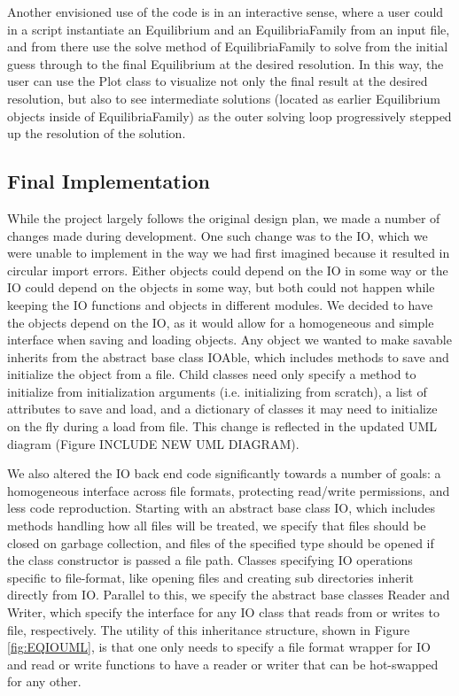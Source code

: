 \documentclass{article}
\begin{document}
Another envisioned use of the code is in an interactive sense, where a user could in a script instantiate an Equilibrium and an EquilibriaFamily from an input file, and from there use the solve method of EquilibriaFamily to solve from the initial guess through to the final Equilibrium at the desired resolution. In this way, the user can use the Plot class to visualize not only the final result at the desired resolution, but also to see intermediate solutions (located as earlier Equilibrium objects inside of EquilibriaFamily) as the outer solving loop progressively stepped up the resolution of the solution.

\subsection{Final Implementation}

While the project largely follows the original design plan, we made a number of changes made during development.
One such change was to the IO, which we were unable to implement in the way we had first imagined because it resulted in circular import errors.
Either objects could depend on the IO in some way or the IO could depend on the objects in some way, but both could not happen while keeping the IO functions and objects in different modules.
We decided to have the objects depend on the IO, as it would allow for a homogeneous and simple interface when saving and loading objects.
Any object we wanted to make savable inherits from the abstract base class IOAble, which includes methods to save and initialize the object from a file.
Child classes need only specify a method to initialize from initialization arguments (i.e. initializing from scratch), a list of attributes to save and load, and a dictionary of classes it may need to initialize on the fly during a load from file.
This change is reflected in the updated UML diagram (Figure INCLUDE NEW UML DIAGRAM).

We also altered the IO back end code significantly towards a number of goals: a homogeneous interface across file formats, protecting read/write permissions, and less code reproduction.
Starting with an abstract base class IO, which includes methods handling how all files will be treated, we specify that files should be closed on garbage collection, and files of the specified type should be opened if the class constructor is passed a file path.
Classes specifying IO operations specific to file-format, like opening files and creating sub directories inherit directly from IO.
Parallel to this, we specify the abstract base classes Reader and Writer, which specify the interface for any IO class that reads from or writes to file, respectively.
The utility of this inheritance structure, shown in Figure \ref{fig:EQIOUML}, is that one only needs to specify a file format wrapper for IO and read or write functions to have a reader or writer that can be hot-swapped for any other.
\end{document}
